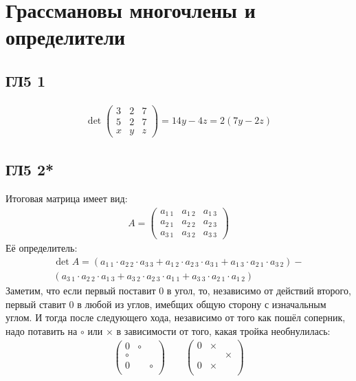 \newpage		
	\section{Грассмановы многочлены и определители}
		
		\subsection{ГЛ5 1}
		\begin{gather*}
			\det
			\begin{pmatrix}
				3 & 2 & 7\\
				5 & 2 & 7\\
				x & y & z
			\end{pmatrix}
			= 14y - 4z = 2(7y - 2z) 
		\end{gather*}
		
		\subsection{ГЛ5 2*}
		Итоговая матрица имеет вид: 
		\begin{gather*}
			A = 
			\begin{pmatrix}
				a_{1\ 1} & a_{1\ 2} & a_{1\ 3}\\
				a_{2\ 1} & a_{2\ 2} & a_{2\ 3}\\
				a_{3\ 1} & a_{3\ 2} & a_{3\ 3}
			\end{pmatrix}
		\end{gather*}
		Её определитель:
		\begin{multline*}
			\det A = ( a_{1\ 1} \cdot a_{2\ 2} \cdot a_{3\ 3} + a_{1\ 2} \cdot a_{2\ 3} \cdot a_{3\ 1} + a_{1\ 3} \cdot a_{2\ 1} \cdot a_{3\ 2}) - \\( a_{3\ 1} \cdot a_{2\ 2} \cdot a_{1\ 3} + a_{3\ 2} \cdot a_{2\ 3} \cdot a_{1\ 1} + a_{3\ 3} \cdot a_{2\ 1} \cdot a_{1\ 2})
		\end{multline*}
		Заметим, что если первый поставит $0$ в угол, то, независимо от действий второго, первый ставит $0$ в любой из углов, имебщих общую сторону с изначальным углом. И тогда после следующего хода, независимо от того как пошёл соперник, надо потавить на $\circ$ или $\times$ в зависимости от того, какая тройка необнулилась:
	 	\begin{gather*}
	 		\begin{pmatrix}
	 			0 & \circ & \\
	 			\circ &  & \\
	 			0 &  & \circ \\
	 		\end{pmatrix}
 		\qquad
 			\begin{pmatrix}
 				0 & \times & \\
 				 &  & \times\\
 				0 & \times & \\
 			\end{pmatrix}
	 	\end{gather*}
 	
